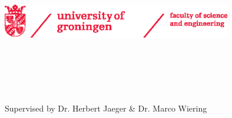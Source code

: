 \begin{titlepage}
    \begin{addmargin}[-1cm]{-3cm}
    \begin{center}
        \includegraphics[width=10cm]{gfx/rugfsehor} \\ \medskip
        \large

        \hfill

        \vfill

        \begingroup
            \color{CTtitle}\spacedallcaps{\myTitle} \\ \bigskip
        \endgroup

        \spacedlowsmallcaps{\myName}

        \vfill

        \myDegree \\
        \myFaculty \\
        \myUni \\ \bigskip
        Supervised by Dr. Herbert Jaeger \& Dr. Marco Wiering \\ \bigskip

        \myTime

        \vfill

    \end{center}
  \end{addmargin}
\end{titlepage}
